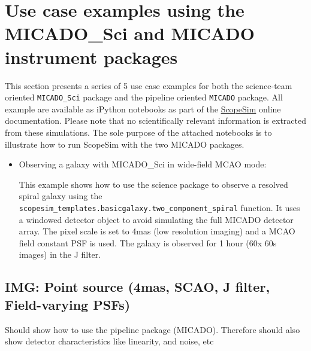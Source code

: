 

\section{Use case examples using the MICADO\_Sci and MICADO instrument packages%
  \label{use-case-examples-using-the-micado-sci-and-micado-instrument-packages}%
}

This section presents a series of 5 use case examples for both the science-team oriented \texttt{MICADO\_Sci} package and the pipeline oriented \texttt{MICADO} package.
All example are available as iPython notebooks as part of the \href{https://scopesim.readthedocs.io/en/latest/}{ScopeSim} online documentation.
Please note that no scientifically relevant information is extracted from these simulations.
The sole purpose of the attached notebooks is to illustrate how to run ScopeSim with the two MICADO packages.

\begin{itemize}
\item Observing a galaxy with MICADO\_Sci in wide-field MCAO mode:

This example shows how to use the science package to observe a resolved spiral galaxy using the \texttt{scopesim\_templates.basicgalaxy.two\_component\_spiral} function.
It uses a windowed detector object to avoid simulating the full MICADO detector array.
The pixel scale is set to 4mas (low resolution imaging) and a MCAO field constant PSF is used.
The galaxy is observed for 1 hour (60x 60s images) in the J filter.
\end{itemize}


\subsection{IMG: Point source (4mas, SCAO, J filter, Field-varying PSFs)%
  \label{img-point-source-4mas-scao-j-filter-field-varying-psfs}%
}

Should show how to use the pipeline package (MICADO). Therefore should also show detector characteristics like linearity, and noise, etc

